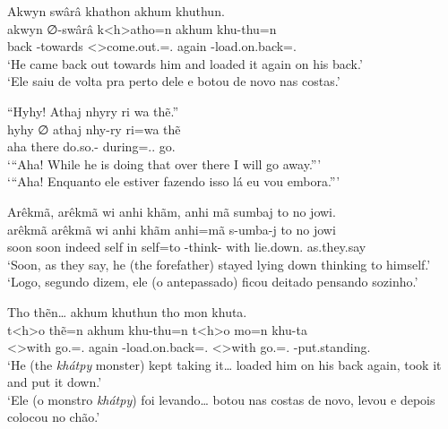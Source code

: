 \documentclass[output=paper,
modfonts,nonflat
]{langsci/langscibook}
\begin{document}
\ea  Akwyn swârâ khathon akhum khuthun. \\[.3em]
\gll akwyn ∅-swârâ        k<h>atho=n                      akhum khu-thu=n                                   \\
     back  \Third-towards <\Third>come.out.\Sg=\AAnd.\Ss{} again \Third-load.on.back=\AAnd.\Ss\footnotemark{} \\
\glt `He came back out towards him and loaded it again on his back.' \\
     `Ele saiu de volta pra perto dele e botou de novo nas costas.' \\
\z

\newpage
\ea  ``Hyhy! Athaj nhyry ri wa thẽ.'' \\[.3em]
\gll hyhy ∅      athaj nhy-ry              ri=wa                    thẽ      \\
     aha  \Fut{} there do.so.\Nmlz-\Nmlz{} during=\AAnd.\Ds.\First{} go.\Sg{} \\
\glt `{}``Aha! While he is doing that over there I will go away.''{}' \\
     `{}``Aha! Enquanto ele estiver fazendo isso lá eu vou embora.''{}' \\
\z

\ea  Arêkmã, arêkmã wi anhi khãm, anhi mã sumbaj to no jowi. \\[.3em]
\gll arêkmã arêkmã wi     anhi khãm anhi=mã s-umba-j             to   no             jowi        \\
     soon   soon   indeed self in   self=to \Third-think-\Nmlz{} with lie.down.\Sg{} as.they.say \\
\glt `Soon, as they say, he (the forefather) stayed lying down thinking to himself.' \\
     `Logo, segundo dizem, ele (o antepassado) ficou deitado pensando sozinho.' \\
\z

\ea  Tho thẽn\ldots{} akhum khuthun tho mon khuta. \\[.3em]
\gll t<h>o        thẽ=n             akhum khu-thu=n                      t<h>o        mo=n              khu-ta                    \\
     <\Third>with go.\Sg=\AAnd.\Ss{} again \Third-load.on.back=\AAnd.\Ss{} <\Third>with go.\Pl=\AAnd.\Ss{} \Third-put.standing.\Sg{} \\
\glt `He (the \textit{khátpy} monster) kept taking it\ldots{} loaded him on his back again, took it and put it down.' \\
     `Ele (o monstro \textit{khátpy}) foi levando\ldots{} botou nas costas de novo, levou e depois colocou no chão.' \\
\z
\end{document}
